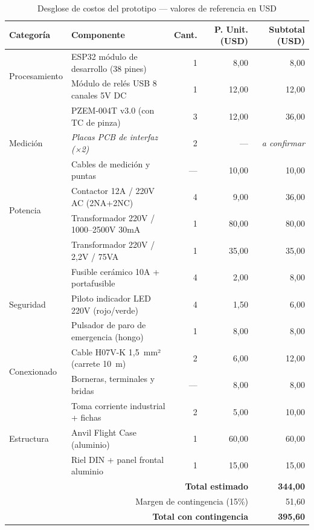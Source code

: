 \begin{table}[H]
\centering
\caption{Desglose de costos del prototipo — valores de referencia en USD}
\label{tab:costos_detalle}
\renewcommand{\arraystretch}{1.3}
\begin{tabular}{@{} l l r r r @{}}
\toprule
\textbf{Categoría} & \textbf{Componente} & \textbf{Cant.} & \textbf{P. Unit. (USD)} & \textbf{Subtotal (USD)} \\
\midrule
\multirow{2}{*}{Procesamiento}
  & ESP32 módulo de desarrollo (38 pines) & 1 & 8{,}00  & 8{,}00  \\
  & Módulo de relés USB 8 canales 5V DC   & 1 & 12{,}00 & 12{,}00 \\
\midrule
\multirow{3}{*}{Medición}
  & PZEM-004T v3.0 (con TC de pinza)      & 3 & 12{,}00 & 36{,}00 \\
  & \textit{Placas PCB de interfaz (×2)}  & 2 & —       & \textit{a confirmar} \\
  & Cables de medición y puntas           & — & 10{,}00 & 10{,}00 \\
\midrule
\multirow{2}{*}{Potencia}
  & Contactor 12A / 220V AC (2NA+2NC)     & 4 & 9{,}00  & 36{,}00 \\
  & Transformador 220V / 1000--2500V 30mA & 1 & 80{,}00 & 80{,}00 \\
  & Transformador 220V / 2{,}2V / 75VA    & 1 & 35{,}00 & 35{,}00 \\
\midrule
\multirow{3}{*}{Seguridad}
  & Fusible cerámico 10A + portafusible    & 4 & 2{,}00  & 8{,}00  \\
  & Piloto indicador LED 220V (rojo/verde) & 4 & 1{,}50  & 6{,}00  \\
  & Pulsador de paro de emergencia (hongo) & 1 & 8{,}00  & 8{,}00  \\
\midrule
\multirow{2}{*}{Conexionado}
  & Cable H07V-K 1,5~mm² (carrete 10~m)   & 2 & 6{,}00  & 12{,}00 \\
  & Borneras, terminales y bridas          & — & 8{,}00  & 8{,}00  \\
  & Toma corriente industrial + fichas     & 2 & 5{,}00  & 10{,}00 \\
\midrule
Estructura
  & Anvil Flight Case (aluminio)           & 1 & 60{,}00 & 60{,}00 \\
  & Riel DIN + panel frontal aluminio      & 1 & 15{,}00 & 15{,}00 \\
\midrule
\multicolumn{4}{r}{\textbf{Total estimado}} & \textbf{344{,}00} \\
\multicolumn{4}{r}{Margen de contingencia (15\%)} & 51{,}60 \\
\multicolumn{4}{r}{\textbf{Total con contingencia}} & \textbf{395{,}60} \\
\bottomrule
\end{tabular}
\end{table}

